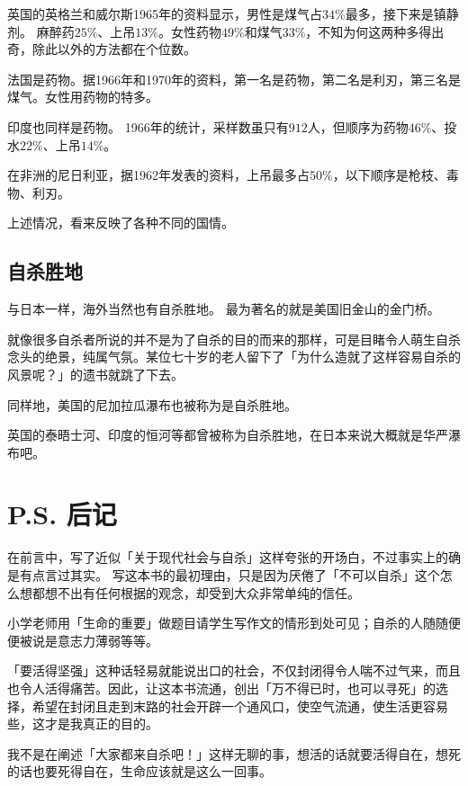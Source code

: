 \documentclass[UTF8]{ctexart}
\begin{document}
英国的英格兰和威尔斯1965年的资料显示，男性是煤气占$34\%$最多，接下来是镇静剂。 
麻醉药$25\%$、上吊$13\%$。女性药物$49\%$和煤气$33\%$，不知为何这两种多得出奇，除此以外的方法都在个位数。

法国是药物。据1966年和1970年的资料，第一名是药物，第二名是利刃，第三名是煤气。女性用药物的特多。

印度也同样是药物。
1966年的统计，采样数虽只有$912$人，但顺序为药物$46\%$、投水$22\%$、上吊$14\%$。

在非洲的尼日利亚，据1962年发表的资料，上吊最多占$50\%$，以下顺序是枪枝、毒物、利刃。

上述情况，看来反映了各种不同的国情。

\subsection{自杀胜地}

与日本一样，海外当然也有自杀胜地。
最为著名的就是美国旧金山的金门桥。

就像很多自杀者所说的并不是为了自杀的目的而来的那样，可是目睹令人萌生自杀念头的绝景，纯属气氛。某位七十岁的老人留下了「为什么造就了这样容易自杀的风景呢？」的遗书就跳了下去。

同样地，美国的尼加拉瓜瀑布也被称为是自杀胜地。

英国的泰晤士河、印度的恒河等都曾被称为自杀胜地，在日本来说大概就是华严瀑布吧。



\newpage

\section{P.S. 后记}

在前言中，写了近似「关于现代社会与自杀」这样夸张的开场白，不过事实上的确是有点言过其实。
写这本书的最初理由，只是因为厌倦了「不可以自杀」这个怎么想都想不出有任何根据的观念，却受到大众非常单纯的信任。

小学老师用「生命的重要」做题目请学生写作文的情形到处可见；自杀的人随随便便被说是意志力薄弱等等。

「要活得坚强」这种话轻易就能说出口的社会，不仅封闭得令人喘不过气来，而且也令人活得痛苦。因此，让这本书流通，创出「万不得已时，也可以寻死」的选择，希望在封闭且走到末路的社会开辟一个通风口，使空气流通，使生活更容易些，这才是我真正的目的。

我不是在阐述「大家都来自杀吧！」这样无聊的事，想活的话就要活得自在，想死的话也要死得自在，生命应该就是这么一回事。

\newpage
\end{document}
